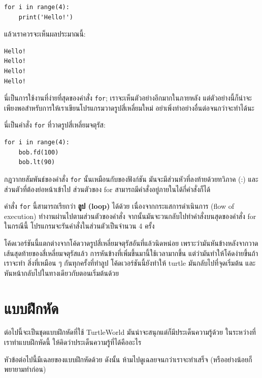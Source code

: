 \begin{verbatim}
for i in range(4):
    print('Hello!')
\end{verbatim}
%
แล้วเราควรจะเห็นผลประมาณนี้:

\begin{verbatim}
Hello!
Hello!
Hello!
Hello!
\end{verbatim}
%
นี่เป็นการใช้งานที่ง่ายที่สุดของคำสั่ง {\tt for}; เราจะเห็นตัวอย่างอีกมากในภายหลัง 
แต่ตัวอย่างนี้ก็น่าจะเพียงพอสำหรับการให้เราเขียนโปรแกรมวาดรูปสี่เหลี่ยมใหม่ 
อย่าเพิ่งทำอย่างอื่นต่อจนกว่าจะทำได้นะ

นี่เป็นคำสั่ง {\tt for} ที่วาดรูปสี่เหลี่ยมจตุรัส:

\begin{verbatim}
for i in range(4):
    bob.fd(100)
    bob.lt(90)
\end{verbatim}
%
กฎวากยสัมพันธ์ของคำสั่ง {\tt for} นั้นเหมือนกับของฟังก์ชัน มันจะมีส่วนหัวที่ลงท้ายด้วยทวิภาค (:)
และส่วนตัวที่ต้องย่อหน้าเข้าไป ส่วนตัวของ for สามารถมีคำสั่งอยู่ภายในได้กี่คำสั่งก็ได้

คำสั่ง {\tt for} นี้สามารถเรียกว่า {\bf ลูป (loop)} ได้ด้วย เนื่องจากกระแสการดำเนินการ 
(flow of execution) ทำงานผ่านไปตามส่วนตัวของคำสั่ง จากนั้นมันจะวนกลับไปทำคำสั่งบนสุดของคำสั่ง for  
ในกรณีนี้ โปรแกรมจะรันคำสั่งในส่วนตัวเป็นจำนวน 4 ครั้ง 

โค้ดเวอร์ชันนี้แตกต่างจากโค้ดวาดรูปสี่เหลี่ยมจตุรัสอันที่แล้วนิดหน่อย 
เพราะว่ามันหันข้างหลังจากวาดเส้นสุดท้ายของสี่เหลี่ยมจตุรัสแล้ว การหันข้างที่เพิ่มขึ้นมานี้ใช้เวลามากขึ้น แต่ว่ามันทำให้โค้ดง่ายขึ้นถ้าเราจะทำ
สิ่งที่เหมือน ๆ กันทุกครั้งที่ทำลูป โค้ดเวอร์ชันนี้ยังทำให้ turtle มันกลับไปที่จุดเริ่มต้น
และหันหน้ากลับไปในทางเดียวกับตอนเริ่มต้นด้วย


\section{แบบฝึกหัด}

ต่อไปนี้จะเป็นชุดแบบฝึกหัดที่ใช้ TurtleWorld มันน่าจะสนุกแต่ก็มีประเด็นความรู้ด้วย
ในระหว่างที่เราทำแบบฝึกหัดนี้ ให้คิดว่าประเด็นความรู้ที่ได้คืออะไร

หัวข้อต่อไปนี้มีเฉลยของแบบฝึกหัดด้วย ดังนั้น ห้ามไปดูเฉลยจนกว่าเราจะทำเสร็จ 
(หรืออย่างน้อยก็พยายามทำก่อน)

